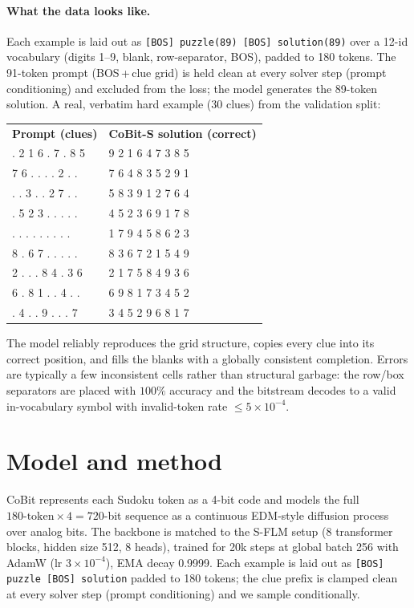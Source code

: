 \documentclass[11pt]{article}
\begin{document}
\paragraph{What the data looks like.} Each example is laid out as
\texttt{[BOS] puzzle(89) [BOS] solution(89)} over a 12-id vocabulary (digits 1--9, blank, row-separator,
BOS), padded to 180 tokens. The 91-token prompt (BOS\,+\,clue grid) is held clean at every solver step
(prompt conditioning) and excluded from the loss; the model generates the 89-token solution. A real,
verbatim hard example (30 clues) from the validation split:

\begin{center}\footnotesize\ttfamily
\begin{tabular}{l@{\hspace{3em}}l}
\textnormal{\textbf{Prompt (clues)}} & \textnormal{\textbf{CoBit-S solution (correct)}}\\[2pt]
. 2 1 6 . 7 . 8 5 & 9 2 1 6 4 7 3 8 5\\
7 6 . . . . 2 . . & 7 6 4 8 3 5 2 9 1\\
. . 3 . . 2 7 . . & 5 8 3 9 1 2 7 6 4\\
. 5 2 3 . . . . . & 4 5 2 3 6 9 1 7 8\\
. . . . . . . . . & 1 7 9 4 5 8 6 2 3\\
8 . 6 7 . . . . . & 8 3 6 7 2 1 5 4 9\\
2 . . . 8 4 . 3 6 & 2 1 7 5 8 4 9 3 6\\
6 . 8 1 . . 4 . . & 6 9 8 1 7 3 4 5 2\\
. 4 . . 9 . . . 7 & 3 4 5 2 9 6 8 1 7\\
\end{tabular}
\end{center}

The model reliably reproduces the grid structure, copies every clue into its correct position, and fills
the blanks with a globally consistent completion. Errors are typically a few inconsistent cells rather than
structural garbage: the row/box separators are placed with $100\%$ accuracy and the bitstream decodes to a
valid in-vocabulary symbol with invalid-token rate $\leq 5\times10^{-4}$.

\section{Model and method}

CoBit represents each Sudoku token as a 4-bit code and models the full $180\text{-token}\times 4 = 720$-bit
sequence as a continuous EDM-style diffusion process over analog bits. The backbone is matched to the
S-FLM setup (8 transformer blocks, hidden size 512, 8 heads), trained for 20k steps at global batch 256
with AdamW (lr $3\times10^{-4}$), EMA decay 0.9999. Each example is laid out as
\texttt{[BOS] puzzle [BOS] solution} padded to 180 tokens; the clue prefix is clamped clean at every solver
step (prompt conditioning) and we sample conditionally.
\end{document}
